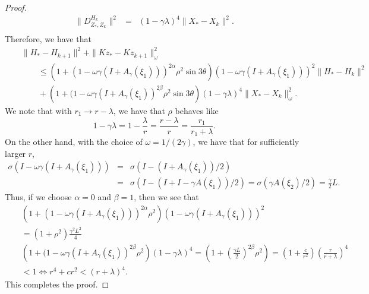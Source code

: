 \begin{itemize}
\begin{proof}
\begin{eqnarray*}
\|D_{Z_*,Z_k}^{H_k}\|^2 &=& (1 - \gamma \lambda)^4 \|X_* - X_k\|^2.  \\ 
\end{eqnarray*}
Therefore, we have that 
\begin{eqnarray*}
&& \|H_{*} - H_{k+1}\|^2 + \|Kz_* - Kz_{k+1}\|^2_{\omega} \\
&& \qquad \leq \left ( 1 + (1 - \omega \gamma (I + A_\gamma(\xi_1)))^{2\alpha}\rho^2 \sin 3\theta \right ) (1 - \omega \gamma (I + A_\gamma(\xi_1)))^2 \|H_* - H_k\|^2  \\
&& \qquad + \left (1 + (1 - \omega\gamma (I + A_\gamma(\xi_1))^{2\beta} \rho^2 \sin 3\theta \right ) (1 - \gamma \lambda)^4  \|X_* - X_k\|_{\omega}^2. 
\end{eqnarray*}
We note that with $r_1 \rightarrow r - \lambda$, we have that $\rho$ behaves like 
\begin{equation} 
1 - \gamma \lambda = 1 - \frac{\lambda}{r} = \frac{r - \lambda}{r} = \frac{r_1}{r_1 + \lambda}.  
\end{equation} 
On the other hand, with the choice of $\omega = 1/(2\gamma)$, we have that for sufficiently larger $r$, 
\begin{eqnarray*}
\sigma(I - \omega \gamma (I + A_\gamma(\xi_1))) &=& \sigma (I - (I + A_\gamma(\xi_1))/2) \\
&=& \sigma (I - (I + I - \gamma A(\xi_1))/2) = \sigma(\gamma A(\xi_2)/2) = \frac{\gamma}{2} L.    
\end{eqnarray*}
Thus, if we choose $\alpha = 0$ and $\beta = 1$, then we see that 
\begin{eqnarray*}
&& \left ( 1 + (1 - \omega \gamma (I + A_\gamma(\xi_1)))^{2\alpha}\rho^2 \right ) (1 - \omega \gamma (I + A_\gamma(\xi_1)))^2 \\
&& = \left ( 1 + \rho^2 \right ) \frac{\gamma^2 L^2}{4} \\
&& \left (1 + (1 - \omega\gamma (I + A_\gamma(\xi_1))^{2\beta} \rho^2 \right ) (1 - \gamma \lambda)^4 = \left ( 1 + \left ( \frac{\gamma L}{2} \right )^{2\beta}\rho^2 \right ) = \left ( 1 + \frac{c}{r^2} \right ) \left (\frac{r}{r + \lambda} \right )^4 \\ 
&& < 1 \Longleftrightarrow r^4 + c r^2 < (r + \lambda)^4. 
\end{eqnarray*}
This completes the proof. 
\end{proof}


\end{itemize}
